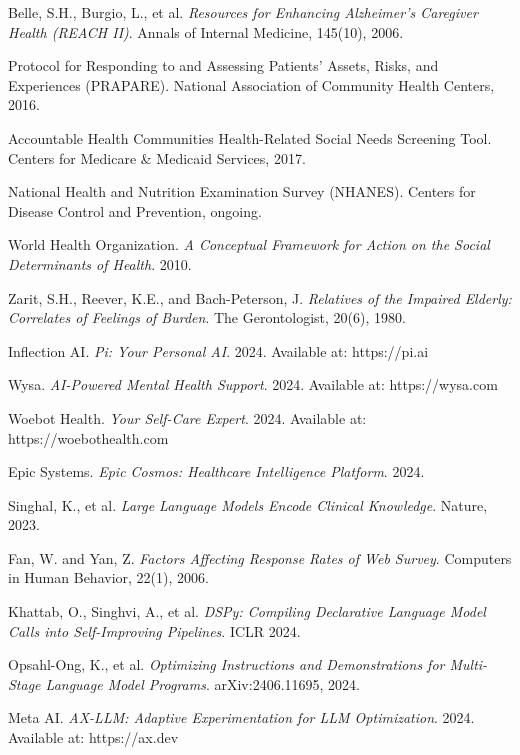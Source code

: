 \documentclass{article}
\begin{document}
\begin{thebibliography}{99}
Belle, S.H., Burgio, L., et al.
\textit{Resources for Enhancing Alzheimer's Caregiver Health (REACH II)}.
Annals of Internal Medicine, 145(10), 2006.

Protocol for Responding to and Assessing Patients' Assets, Risks, and Experiences (PRAPARE).
National Association of Community Health Centers, 2016.

Accountable Health Communities Health-Related Social Needs Screening Tool.
Centers for Medicare \& Medicaid Services, 2017.

National Health and Nutrition Examination Survey (NHANES).
Centers for Disease Control and Prevention, ongoing.

World Health Organization.
\textit{A Conceptual Framework for Action on the Social Determinants of Health}.
2010.

Zarit, S.H., Reever, K.E., and Bach-Peterson, J.
\textit{Relatives of the Impaired Elderly: Correlates of Feelings of Burden}.
The Gerontologist, 20(6), 1980.

Inflection AI.
\textit{Pi: Your Personal AI}.
2024. Available at: https://pi.ai

Wysa.
\textit{AI-Powered Mental Health Support}.
2024. Available at: https://wysa.com

Woebot Health.
\textit{Your Self-Care Expert}.
2024. Available at: https://woebothealth.com

Epic Systems.
\textit{Epic Cosmos: Healthcare Intelligence Platform}.
2024.

Singhal, K., et al.
\textit{Large Language Models Encode Clinical Knowledge}.
Nature, 2023.

Fan, W. and Yan, Z.
\textit{Factors Affecting Response Rates of Web Survey}.
Computers in Human Behavior, 22(1), 2006.

Khattab, O., Singhvi, A., et al.
\textit{DSPy: Compiling Declarative Language Model Calls into Self-Improving Pipelines}.
ICLR 2024.

Opsahl-Ong, K., et al.
\textit{Optimizing Instructions and Demonstrations for Multi-Stage Language Model Programs}.
arXiv:2406.11695, 2024.

Meta AI.
\textit{AX-LLM: Adaptive Experimentation for LLM Optimization}.
2024. Available at: https://ax.dev


\end{thebibliography}
\end{document}
